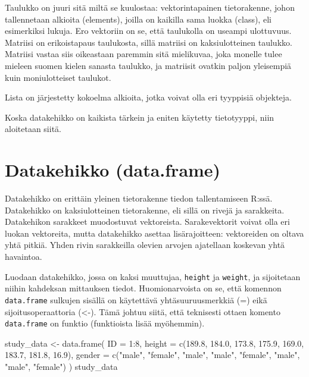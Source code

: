\documentclass[
]{book}
\newenvironment{Shaded}{\begin{snugshade}}{\end{snugshade}}
\newcommand{\AttributeTok}[1]{\textcolor[rgb]{0.77,0.63,0.00}{#1}}
\newcommand{\DecValTok}[1]{\textcolor[rgb]{0.00,0.00,0.81}{#1}}
\newcommand{\FloatTok}[1]{\textcolor[rgb]{0.00,0.00,0.81}{#1}}
\newcommand{\FunctionTok}[1]{\textcolor[rgb]{0.00,0.00,0.00}{#1}}
\newcommand{\NormalTok}[1]{#1}
\newcommand{\OtherTok}[1]{\textcolor[rgb]{0.56,0.35,0.01}{#1}}
\newcommand{\SpecialCharTok}[1]{\textcolor[rgb]{0.00,0.00,0.00}{#1}}
\newcommand{\StringTok}[1]{\textcolor[rgb]{0.31,0.60,0.02}{#1}}
\begin{document}
Taulukko on juuri sitä miltä se kuulostaa: vektorintapainen tietorakenne, johon tallennetaan alkioita (elements), joilla on kaikilla sama luokka (class), eli esimerkiksi lukuja. Ero vektoriin on se, että taulukolla on useampi ulottuvuus. Matriisi on erikoistapaus taulukosta, sillä matriisi on kaksiulotteinen taulukko. Matriisi vastaa siis oikeastaan paremmin sitä mielikuvaa, joka monelle tulee mieleen suomen kielen sanasta taulukko, ja matriisit ovatkin paljon yleisempiä kuin moniulotteiset taulukot.

Lista on järjestetty kokoelma alkioita, jotka voivat olla eri tyyppisiä objekteja.

Koska datakehikko on kaikista tärkein ja eniten käytetty tietotyyppi, niin aloitetaan siitä.

\hypertarget{data-frame}{%
\section{Datakehikko (data.frame)}\label{data-frame}}

Datakehikko on erittäin yleinen tietorakenne tiedon tallentamiseen R:ssä. Datakehikko on kaksiulotteinen tietorakenne, eli sillä on rivejä ja sarakkeita. Datakehikon sarakkeet muodostuvat vektoreista. Sarakevektorit voivat olla eri luokan vektoreita, mutta datakehikko asettaa lisärajoitteen: vektoreiden on oltava yhtä pitkiä. Yhden rivin sarakkeilla olevien arvojen ajatellaan koskevan yhtä havaintoa.

Luodaan datakehikko, jossa on kaksi muuttujaa, \texttt{height} ja \texttt{weight}, ja sijoitetaan niihin kahdeksan mittauksen tiedot. Huomionarvoista on se, että komennon \texttt{data.frame} sulkujen sisällä on käytettävä yhtäsuuruusmerkkiä (=) eikä sijoitusoperaattoria (\textless-). Tämä johtuu siitä, että teknisesti ottaen komento \texttt{data.frame} on funktio (funktioista lisää myöhemmin).

\begin{Shaded}
\begin{Highlighting}[]
\NormalTok{study\_data }\OtherTok{\textless{}{-}} \FunctionTok{data.frame}\NormalTok{(}
    \AttributeTok{ID =} \DecValTok{1}\SpecialCharTok{:}\DecValTok{8}\NormalTok{,}
    \AttributeTok{height =} \FunctionTok{c}\NormalTok{(}\FloatTok{189.8}\NormalTok{, }\FloatTok{184.0}\NormalTok{, }\FloatTok{173.8}\NormalTok{, }\FloatTok{175.9}\NormalTok{, }\FloatTok{169.0}\NormalTok{, }\FloatTok{183.7}\NormalTok{, }\FloatTok{181.8}\NormalTok{, }\FloatTok{16.9}\NormalTok{),}
    \AttributeTok{gender =} \FunctionTok{c}\NormalTok{(}\StringTok{"male"}\NormalTok{, }\StringTok{"female"}\NormalTok{, }\StringTok{"male"}\NormalTok{, }\StringTok{"male"}\NormalTok{, }\StringTok{"female"}\NormalTok{, }\StringTok{"male"}\NormalTok{, }\StringTok{"male"}\NormalTok{, }\StringTok{"female"}\NormalTok{)}
\NormalTok{)}
\NormalTok{study\_data}
\end{Highlighting}
\end{Shaded}
\end{document}
